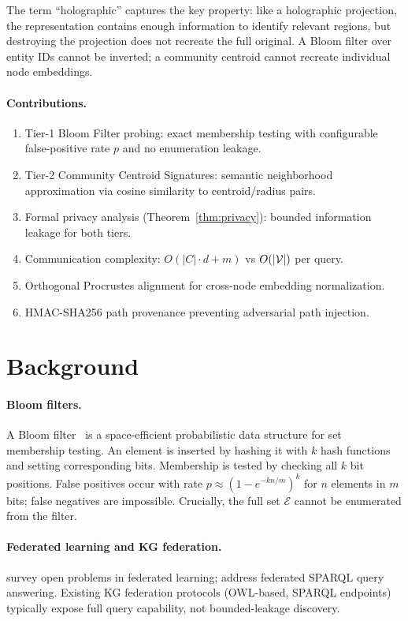 \documentclass[10pt,twocolumn]{article}
\begin{document}
The term ``holographic'' captures the key property: like a holographic projection, the
representation contains enough information to identify relevant regions, but destroying
the projection does not recreate the full original. A Bloom filter over entity IDs
cannot be inverted; a community centroid cannot recreate individual node embeddings.

\paragraph{Contributions.}
\begin{enumerate}
  \item Tier-1 Bloom Filter probing: exact membership testing with configurable
        false-positive rate $p$ and no enumeration leakage.
  \item Tier-2 Community Centroid Signatures: semantic neighborhood approximation
        via cosine similarity to centroid/radius pairs.
  \item Formal privacy analysis (Theorem~\ref{thm:privacy}): bounded information
        leakage for both tiers.
  \item Communication complexity: $O(|C| \cdot d + m)$ vs $O(|\mathcal{V}|)$ per query.
  \item Orthogonal Procrustes alignment for cross-node embedding normalization.
  \item HMAC-SHA256 path provenance preventing adversarial path injection.
\end{enumerate}

\section{Background}
\label{sec:background}

\paragraph{Bloom filters.}
A Bloom filter~\cite{bloom1970} is a space-efficient probabilistic data structure for
set membership testing. An element is inserted by hashing it with $k$ hash functions
and setting corresponding bits. Membership is tested by checking all $k$ bit positions.
False positives occur with rate $p \approx (1-e^{-kn/m})^k$ for $n$ elements in $m$
bits; false negatives are impossible. Crucially, the full set $\mathcal{E}$ cannot be
enumerated from the filter.

\paragraph{Federated learning and KG federation.}
\citet{kairouz2021} survey open problems in federated learning; \citet{bonatti2019} address
federated SPARQL query answering. Existing KG federation protocols (OWL-based,
SPARQL endpoints) typically expose full query capability, not bounded-leakage discovery.
\end{document}
